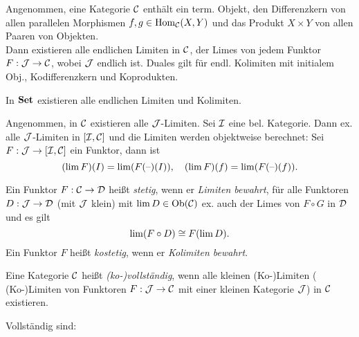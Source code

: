 \documentclass{cheat-sheet}
\begin{document}
\begin{satz}
  Angenommen, eine Kategorie $\mathcal{C}$ enthält ein term. Objekt, den Differenzkern von allen parallelen Morphismen $f, g \in \operatorname{Hom}_{\mathcal{C}}(X, Y)$ und das Produkt $X \times Y$ von allen Paaren von Objekten. \\
  Dann existieren alle endlichen Limiten in $\mathcal{C}$, \dh{} der Limes von jedem Funktor $F : \mathcal{J} \to \mathcal{C}$, wobei $\mathcal{J}$ endlich ist.
  Duales gilt für endl. Kolimiten mit initialem Obj., Kodifferenzkern und Koprodukten.
\end{satz}

\begin{kor}
  In $\SetC$ existieren alle endlichen Limiten und Kolimiten.
\end{kor}

\begin{bem}
  Angenommen, in $\mathcal{C}$ existieren alle $\mathcal{J}$-Limiten.
  Sei $\mathcal{I}$ eine bel. Kategorie.
  Dann ex. alle $\mathcal{J}$-Limiten in $[\mathcal{I}, \mathcal{C}]$ und die Limiten werden objektweise berechnet:
  Sei $F : \mathcal{J} \to [\mathcal{I}, \mathcal{C}]$ ein Funktor, dann ist
  \[
    (\lim F)(I) = \lim (F(\text{--})(I)), \quad
    (\lim F)(f) = \lim (F(\text{--})(f)).
  \]
\end{bem}

\begin{defn}
  Ein Funktor $F : \mathcal{C} \to \mathcal{D}$ heißt \emph{stetig}, wenn er \emph{Limiten bewahrt}, \dh{} für alle Funktoren $D : \mathcal{J} \to \mathcal{D}$ (mit $\mathcal{J}$ klein) mit $\lim D \in \operatorname{Ob}(\mathcal{C})$ ex. auch der Limes von $F \circ G$ in $\mathcal{D}$ und es gilt
  \[ \lim (F \circ D) \cong F(\lim D). \]
  Ein Funktor $F$ heißt \emph{kostetig}, wenn er \emph{Kolimiten bewahrt}.
\end{defn}

\begin{defn}
  Eine Kategorie $\mathcal{C}$ heißt \emph{(ko-)vollständig}, wenn alle kleinen (Ko-)Limiten (\dh{} (Ko-)Limiten von Funktoren $F : \mathcal{J} \to \mathcal{C}$ mit einer kleinen Kategorie $\mathcal{J}$) in $\mathcal{C}$ existieren.
\end{defn}

\begin{bspe}
  Vollständig sind: \enspace
  \inlineitem{$\SetC$,}
  \inlineitem{$\Grp$,}
  \inlineitem{$\AbGrp$,}
  \inlineitem{$\Top$,}
\end{bspe}

\end{document}
